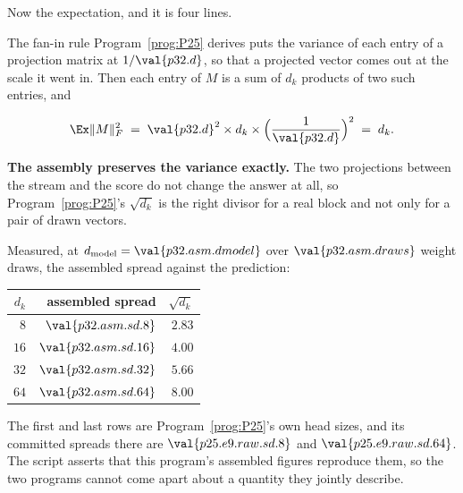 \begin{fr}
Now the expectation, and it is four lines.

The fan-in rule Program~\ref{prog:P25} derives puts the variance of each
entry of a projection matrix at $1/\val{p32.d}$, so that a projected vector
comes out at the scale it went in. Then each entry of $M$ is a sum of $d_k$
products of two such entries, and

\[ \Ex\lVert M\rVert_F^{2}
   \;=\; \val{p32.d}^{2} \times d_k \times
         \Bigl(\frac{1}{\val{p32.d}}\Bigr)^{2}
   \;=\; d_k. \]

\textbf{The assembly preserves the variance exactly.} The two projections
between the stream and the score do not change the answer at all, so
Program~\ref{prog:P25}'s $\sqrt{d_k}$ is the right divisor for a real block
and not only for a pair of drawn vectors.

Measured, at $d_{\text{model}} = \val{p32.asm.dmodel}$ over
$\val{p32.asm.draws}$ weight draws, the assembled spread against the
prediction:

\begin{center}
\begin{tabular}{rrr}
\toprule
$d_k$ & assembled spread & $\sqrt{d_k}$ \\
\midrule
$8$  & $\val{p32.asm.sd.8}$  & $\num{2.83}$ \\
$16$ & $\val{p32.asm.sd.16}$ & $\num{4.00}$ \\
$32$ & $\val{p32.asm.sd.32}$ & $\num{5.66}$ \\
$64$ & $\val{p32.asm.sd.64}$ & $\num{8.00}$ \\
\bottomrule
\end{tabular}
\end{center}

The first and last rows are Program~\ref{prog:P25}'s own head sizes, and its
committed spreads there are $\val{p25.e9.raw.sd.8}$ and
$\val{p25.e9.raw.sd.64}$. The script asserts that this program's assembled
figures reproduce them, so the two programs cannot come apart about a
quantity they jointly describe.
\end{fr}

